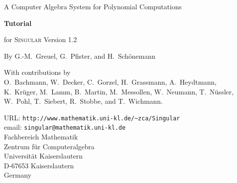 \documentclass[a4paper,german]{article}
\begin{document}

\begin{center}

\begin{figure}[h]
\noindent
\centering{}
\end{figure}

    {\Large A Computer Algebra System for Polynomial Computations}

\vspace{15ex}

\Huge{\textbf{Tutorial}}

\huge{for \textsc{Singular} Version 1.2}

\vspace{5ex}

\Large{By G.-M.~Greuel, G.~Pfister, and H.~Schönemann}
\end{center}

\begin{center}
  \large{With contributions by} \\
\large{O.~Bachmann, W.~Decker, C.~Gorzel,
  H.~Grassmann, A.~Heydtmann, K.~Krüger, M.~Lamm, B.~Martin,
  M.~Messollen, W.~Neumann, T.~Nüssler, W.~Pohl, T.~Siebert,
  R.~Stobbe, and T.~Wichmann.}
\end{center}

\vspace{20ex}

\begin{center}
  \large{
    URL: \verb?http://www.mathematik.uni-kl.de/~zca/Singular? \\
    email: \verb?singular@mathematik.uni-kl.de?\\
    Fachbereich Mathematik \\
    Zentrum für Computeralgebra \\
    Universität Kaiserslautern \\
    D-67653 Kaiserslautern \\
    Germany}
\end{center}
\end{document}
